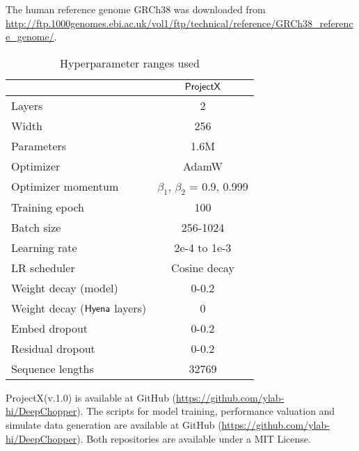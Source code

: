 \documentclass[pdflatex, sn-mathphys-num, lineno]{sn-jnl}%
\newcommand{\chopper}{ProjectX\xspace}
\theoremstyle{thmstyleone}%
\theoremstyle{thmstyletwo}%
\theoremstyle{thmstylethree}%
\begin{document}
The human reference genome GRCh38 was downloaded from \url{http://ftp.1000genomes.ebi.ac.uk/vol1/ftp/technical/reference/GRCh38\_reference\_genome/}.


\begin{table}
	\small
	\centering
	\caption{Hyperparameter ranges used}
	\vspace{10pt}
	\begin{tabular}{lc}
		\toprule
		                                    & {$\sf \chopper$}                  \\
		\midrule
		Layers                              & 2                                 \\
		Width                               & 256                               \\
		Parameters                          & 1.6M                              \\
		Optimizer                           & AdamW                             \\
		Optimizer momentum                  & $\beta_1$, $\beta_2$ = 0.9, 0.999 \\
		Training epoch                      & 100                               \\
		Batch size                          & 256-1024                          \\
		Learning rate                       & 2e-4 to 1e-3                      \\
		LR scheduler                        & Cosine decay                      \\
		Weight decay (model)                & 0-0.2                             \\
		Weight decay ({$\sf Hyena$} layers) & 0                                 \\
		Embed dropout                       & 0-0.2                             \\
		Residual dropout                    & 0-0.2                             \\
		Sequence lengths                    & 32769                             \\
		\midrule
	\end{tabular}
	\label{tab:nucleotideTRX_hyperparameter}
\end{table}



\chopper (v.1.0) is available at GitHub (\url{https://github.com/ylab-hi/DeepChopper}).
The scripts for model training, performance valuation and simulate data generation are available at GitHub (\url{https://github.com/ylab-hi/DeepChopper}).
Both repositories are available under a MIT License.
\end{document}
